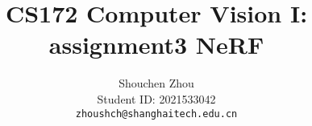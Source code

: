 \documentclass[10pt,twocolumn,letterpaper]{article}
\title{CS172 Computer Vision I:\\assignment3 NeRF}
\author{Shouchen Zhou\\
Student ID: 2021533042\\
{\tt\small zhoushch@shanghaitech.edu.cn}
}
\begin{document}
\maketitle






{
    \small
    
    
}

% 
\end{document}
